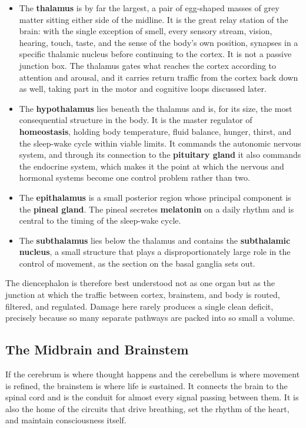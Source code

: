 \documentclass[11pt]{article}
\begin{document}
\begin{itemize}
    \item The \textbf{thalamus} is by far the largest, a pair of egg-shaped masses of grey matter sitting either side of the midline. It is the great relay station of the brain: with the single exception of smell, every sensory stream, vision, hearing, touch, taste, and the sense of the body's own position, synapses in a specific thalamic nucleus before continuing to the cortex. It is not a passive junction box. The thalamus gates what reaches the cortex according to attention and arousal, and it carries return traffic from the cortex back down as well, taking part in the motor and cognitive loops discussed later.
    \item The \textbf{hypothalamus} lies beneath the thalamus and is, for its size, the most consequential structure in the body. It is the master regulator of \textbf{homeostasis}, holding body temperature, fluid balance, hunger, thirst, and the sleep-wake cycle within viable limits. It commands the autonomic nervous system, and through its connection to the \textbf{pituitary gland} it also commands the endocrine system, which makes it the point at which the nervous and hormonal systems become one control problem rather than two.
    \item The \textbf{epithalamus} is a small posterior region whose principal component is the \textbf{pineal gland}. The pineal secretes \textbf{melatonin} on a daily rhythm and is central to the timing of the sleep-wake cycle.
    \item The \textbf{subthalamus} lies below the thalamus and contains the \textbf{subthalamic nucleus}, a small structure that plays a disproportionately large role in the control of movement, as the section on the basal ganglia sets out.
\end{itemize}

The diencephalon is therefore best understood not as one organ but as the junction at which the traffic between cortex, brainstem, and body is routed, filtered, and regulated. Damage here rarely produces a single clean deficit, precisely because so many separate pathways are packed into so small a volume.

\subsection{The Midbrain and Brainstem}

If the cerebrum is where thought happens and the cerebellum is where movement is refined, the brainstem is where life is sustained. It connects the brain to the spinal cord and is the conduit for almost every signal passing between them. It is also the home of the circuits that drive breathing, set the rhythm of the heart, and maintain consciousness itself.
\end{document}
